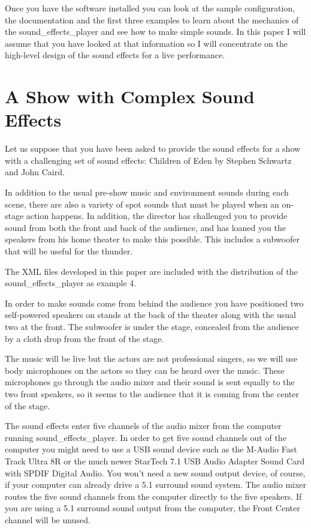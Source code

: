 \documentclass[letterpaper,twoside]{article}
\begin{document}
Once you have the software installed you can look at the sample
configuration, the documentation and the first three examples
to learn about the
mechanics of the sound\_effects\_player and see how to make simple sounds.
In this paper I will assume that you have looked at that information
so I will concentrate on the high-level design of the sound
effects for a live performance.

\section{A Show with Complex Sound Effects}

Let us suppose that you have been asked to provide the sound effects
for a show with a challenging set of sound effects:
Children of Eden by Stephen Schwartz and John Caird.

In addition to the usual pre-show music and environment sounds
during each scene,
there are also a variety of spot sounds that must be played
when an on-stage action happens.
In addition, the director has challenged you to provide sound from
both the front and back of the audience, and has loaned you
the speakers from his home theater to make this possible.
This includes a subwoofer that will be useful for the thunder.

The XML files developed in this paper are included with the distribution
of the sound\_effects\_player as example 4.

In order to make sounds come from behind the audience you have
positioned two self-powered speakers on stands
at the back of the theater along with the usual two at the front.
The subwoofer is under the stage, concealed from the audience
by a cloth drop from the front of the stage.

The music will be live but the actors are not professional singers,
so we will use body microphones on the actors so they can be heard
over the music.  These microphones go through the audio mixer and
their sound is sent equally to the two front speakers, so it seems
to the audience that it is coming from the center of the stage.

The sound effects enter five channels of the audio mixer from
the computer running sound\_effects\_player.  In order to get
five sound channels out of the computer you might need to use a USB
sound device such as the M-Audio Fast Track Ultra 8R or
the much newer StarTech 7.1 USB Audio Adapter Sound Card with
SPDIF Digital Audio.  You won't need a new sound output device,
of course, if your computer can already drive a 5.1 surround sound system.
The audio mixer routes the five sound channels from the computer
directly to the five speakers.  If you are using a 5.1 surround sound
output from the computer, the Front Center channel will be unused.
\end{document}
